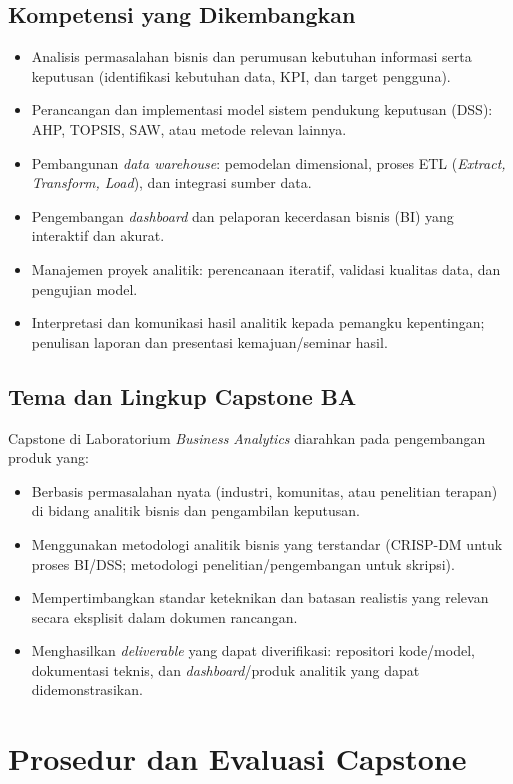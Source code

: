 \documentclass[12pt,a4paper]{report}
\begin{document}
\section{Kompetensi yang Dikembangkan}
\begin{itemize}
\item Analisis permasalahan bisnis dan perumusan kebutuhan informasi serta keputusan (identifikasi kebutuhan data, KPI, dan target pengguna).
\item Perancangan dan implementasi model sistem pendukung keputusan (DSS): AHP, TOPSIS, SAW, atau metode relevan lainnya.
\item Pembangunan \emph{data warehouse}: pemodelan dimensional, proses ETL (\emph{Extract, Transform, Load}), dan integrasi sumber data.
\item Pengembangan \emph{dashboard} dan pelaporan kecerdasan bisnis (BI) yang interaktif dan akurat.
\item Manajemen proyek analitik: perencanaan iteratif, validasi kualitas data, dan pengujian model.
\item Interpretasi dan komunikasi hasil analitik kepada pemangku kepentingan; penulisan laporan dan presentasi kemajuan/seminar hasil.
\end{itemize}

\section{Tema dan Lingkup Capstone BA}
Capstone di Laboratorium \emph{Business Analytics} diarahkan pada pengembangan produk yang:
\begin{itemize}
\item Berbasis permasalahan nyata (industri, komunitas, atau penelitian terapan) di bidang analitik bisnis dan pengambilan keputusan.
\item Menggunakan metodologi analitik bisnis yang terstandar (CRISP-DM untuk proses BI/DSS; metodologi penelitian/pengembangan untuk skripsi).
\item Mempertimbangkan standar keteknikan dan batasan realistis yang relevan secara eksplisit dalam dokumen rancangan.
\item Menghasilkan \emph{deliverable} yang dapat diverifikasi: repositori kode/model, dokumentasi teknis, dan \emph{dashboard}/produk analitik yang dapat didemonstrasikan.
\end{itemize}

\chapter{Prosedur dan Evaluasi Capstone}
\end{document}
